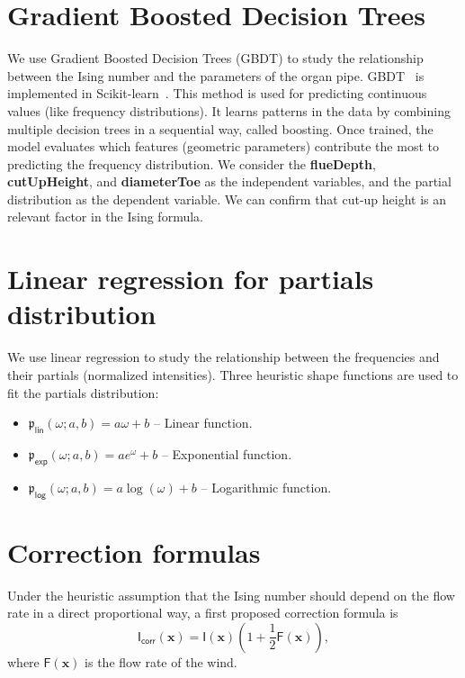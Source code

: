 \documentclass{psu-report}
\begin{document}
\section{Gradient Boosted Decision Trees}

We use Gradient Boosted Decision Trees (GBDT) to study the relationship
between the Ising number and the parameters of the organ pipe.
GBDT~\autocite{2001Fri-1} is implemented in Scikit-learn~\autocite{2016Kra-1}.
This method is used for predicting continuous values (like frequency
distributions).
It learns patterns in the data by combining multiple decision trees in a
sequential way, called boosting.
Once trained, the model evaluates which features (geometric parameters)
contribute the most to predicting the frequency distribution.
We consider the \textbf{flueDepth}, \textbf{cutUpHeight}, and
\textbf{diameterToe} as the independent variables, and the
partial distribution as the dependent variable.
We can confirm that cut-up height is an relevant factor in the Ising formula.

\section{Linear regression for partials distribution}

We use linear regression to study the relationship between the frequencies and
their partials (normalized intensities).
Three heuristic shape functions are used to fit the partials distribution:
\begin{itemize}
    \item \(\mathfrak{p}_\mathsf{lin}(\omega; a, b) = a \omega + b\) -- Linear function.
    \item \(\mathfrak{p}_\mathsf{exp}(\omega; a, b) = a e^{\omega} + b\) -- Exponential function.
    \item \(\mathfrak{p}_\mathsf{log}(\omega; a, b) = a \log(\omega) + b\) -- Logarithmic function.
\end{itemize}

\section{Correction formulas}

Under the heuristic assumption that the Ising number should depend on the flow
rate in a direct proportional way, a first proposed correction formula is
\begin{equation}
    \label{eq:ising_correction}
    \mathsf{I}_\mathsf{corr}(\mathbf{x}) = \mathsf{I}(\mathbf{x})
    (1 + \frac{1}{2} \mathsf{F}(\mathbf{x})),
\end{equation}
where \(\mathsf{F}(\mathbf{x})\) is the flow rate of the wind.
\end{document}
